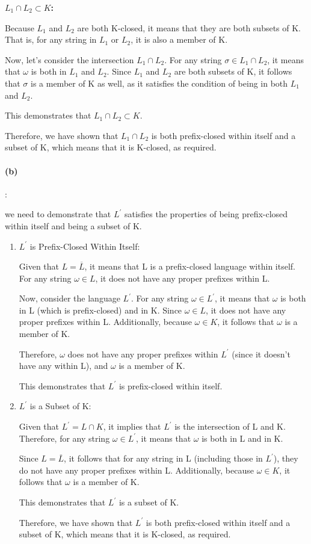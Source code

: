 \documentclass{article}
\begin{document}
\textbf{$L_1 \cap L_2 \subset K$:}

Because $L_1$ and $L_2$ are both K-closed, it means that they are both subsets of K. That is, for any string in $L_1$ or $L_2$, it is also a member of K.

Now, let's consider the intersection $L_1 \cap L_2$. For any string $\sigma \in L_1 \cap L_2$, it means that $\omega$ is both in $L_1$ and $L_2$. Since $L_1$ and $L_2$ are both subsets of K, it follows that $\sigma$ is a member of K as well, as it satisfies the condition of being in both $L_1$ and $L_2$.

This demonstrates that $L_1 \cap L_2 \subset K$.

Therefore, we have shown that $L_1 \cap L_2$ is both prefix-closed within itself and a subset of K, which means that it is K-closed, as required.

\paragraph{(b)}:

we need to demonstrate that $L^\prime$ satisfies the properties of being prefix-closed within itself and being a subset of K.

\begin{enumerate}
  \item $L^\prime$ is Prefix-Closed Within Itself:
  
  Given that $L = \overline{L}$, it means that L is a prefix-closed language within itself. For any string $\omega \in L$, it does not have any proper prefixes within L.

  Now, consider the language $L^\prime$. For any string $\omega \in L^\prime$, it means that $\omega$ is both in L (which is prefix-closed) and in K. Since $\omega  \in L$, it does not have any proper prefixes within L. Additionally, because $\omega \in K$, it follows that $\omega$ is a member of K.
  
  Therefore, $\omega$ does not have any proper prefixes within $L^\prime$ (since it doesn't have any within L), and $\omega$ is a member of K.
  
  This demonstrates that $L^\prime$ is prefix-closed within itself.

  \item $L^\prime$ is a Subset of K:
  
  Given that $L^\prime = L \cap K$, it implies that $L^\prime$ is the intersection of L and K. Therefore, for any string $\omega \in L^\prime$, it means that $\omega$ is both in L and in K.

  Since $L = \overline{L}$, it follows that for any string in L (including those in $L^\prime$), they do not have any proper prefixes within L. Additionally, because $\omega \in K$, it follows that $\omega$ is a member of K.

  This demonstrates that $L^\prime$ is a subset of K.

  Therefore, we have shown that $L^\prime$ is both prefix-closed within itself and a subset of K, which means that it is K-closed, as required.

\end{enumerate}
\end{document}
